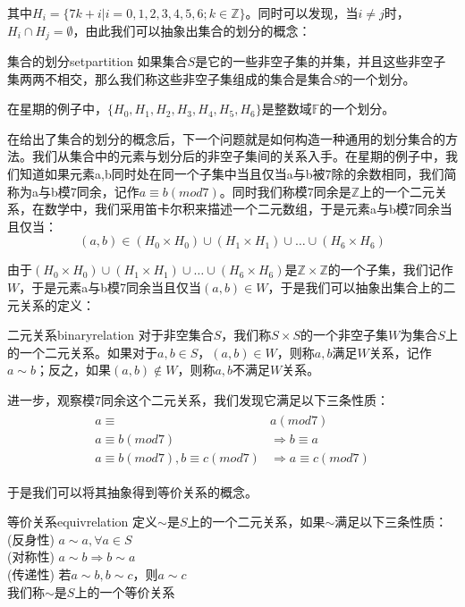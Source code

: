    其中$H_i=\{7k+i|i=0,1,2,3,4,5,6;k\in\mathbb{Z}\}$。同时可以发现，当$i\ne j$时，$H_i\cap H_j=\emptyset$，由此我们可以抽象出集合的划分的概念：
   \begin{definition}{集合的划分}{setpartition}
       如果集合$S$是它的一些非空子集的并集，并且这些非空子集两两不相交，那么我们称这些非空子集组成的集合是集合$S$的一个划分。
   \end{definition}
   
   在星期的例子中，$\{H_0,H_1,H_2,H_3,H_4,H_5,H_6\}$是整数域$\mathbb{F}$的一个划分。
   
   在给出了集合的划分的概念后，下一个问题就是如何构造一种通用的划分集合的方法。我们从集合中的元素与划分后的非空子集间的关系入手。在星期的例子中，我们知道如果元素a,b同时处在同一个子集中当且仅当a与b被7除的余数相同，我们简称为a与b模7同余，记作$a\equiv b(mod7)$。同时我们称模7同余是$\mathbb{Z}$上的一个二元关系，在数学中，我们采用笛卡尔积来描述一个二元数组，于是元素a与b模7同余当且仅当：
   \begin{equation}
       (a,b)\in (H_0\times H_0)\cup (H_1\times H_1)\cup \dots \cup (H_6\times H_6)
   \end{equation}
   
   由于$(H_0\times H_0)\cup (H_1\times H_1)\cup \dots \cup (H_6\times H_6)$是$\mathbb{Z}\times\mathbb{Z}$的一个子集，我们记作$W$，于是元素a与b模7同余当且仅当$(a,b)\in W$，于是我们可以抽象出集合上的二元关系的定义：
   \begin{definition}{二元关系}{binaryrelation}
       对于非空集合$S$，我们称$S\times S$的一个非空子集$W$为集合$S$上的一个二元关系。如果对于$a,b\in S$，$(a,b)\in W$，则称$a,b$满足$W$关系，记作$a\sim b$；反之，如果$(a,b)\notin W$，则称$a,b$不满足$W$关系。
   \end{definition}
   
   进一步，观察模7同余这个二元关系，我们发现它满足以下三条性质：
   \begin{align}
       \begin{split}
           a\equiv& a(mod7)\\
          a\equiv b(mod7)&\Rightarrow b\equiv a\\
          a\equiv b(mod7),b\equiv c(mod7)&\Rightarrow a\equiv c(mod7)
       \end{split}
   \end{align}
   
   于是我们可以将其抽象得到等价关系的概念。
   \begin{definition}{等价关系}{equivrelation}
       定义$\sim$是$S$上的一个二元关系，如果$\sim$满足以下三条性质：\\
           (反身性) $a\sim a,\forall a\in S$\\
           (对称性) $a\sim b \Rightarrow b\sim a$\\
           (传递性) 若$a\sim b,b\sim c$，则$a\sim c$\\
       我们称$\sim \textrm{是}S$上的一个等价关系
   \end{definition}
   
